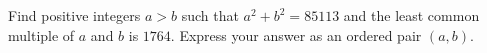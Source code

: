 Find positive integers $a>b$ such that $a^2+b^2=85113$ and the least common multiple of $a$ and $b$ is $1764$. Express your answer as an ordered pair $(a,b)$.
